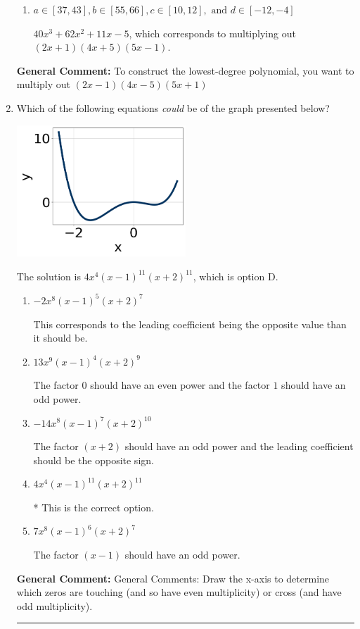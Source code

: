 \documentclass{extbook}[14pt]
\newcommand{\litem}[1]{\item #1

\rule{\textwidth}{0.4pt}}
\begin{document}
\begin{enumerate}
{\begin{enumerate}[label=\Alph*.]
$40x^{3} +78 x^{2} +39 x + 5$, which corresponds to multiplying out $(2x + 1)(4x + 5)(5x + 1)$.
\item \( a \in [37, 43], b \in [55, 66], c \in [10, 12], \text{ and } d \in [-12, -4] \)

$40x^{3} +62 x^{2} +11 x -5$, which corresponds to multiplying out $(2x + 1)(4x + 5)(5x -1)$.
\end{enumerate}

\textbf{General Comment:} To construct the lowest-degree polynomial, you want to multiply out $(2x -1)(4x -5)(5x + 1)$
}
\litem{
Which of the following equations \textit{could} be of the graph presented below?

\begin{center}
    \includegraphics[width=0.5\textwidth]{../Figures/polyGraphToFunctionCopyC.png}
\end{center}


The solution is \( 4x^{4} (x - 1)^{11} (x + 2)^{11} \), which is option D.\begin{enumerate}[label=\Alph*.]
\item \( -2x^{8} (x - 1)^{5} (x + 2)^{7} \)

This corresponds to the leading coefficient being the opposite value than it should be.
\item \( 13x^{9} (x - 1)^{4} (x + 2)^{9} \)

The factor $0$ should have an even power and the factor $1$ should have an odd power.
\item \( -14x^{8} (x - 1)^{7} (x + 2)^{10} \)

The factor $(x + 2)$ should have an odd power and the leading coefficient should be the opposite sign.
\item \( 4x^{4} (x - 1)^{11} (x + 2)^{11} \)

* This is the correct option.
\item \( 7x^{8} (x - 1)^{6} (x + 2)^{7} \)

The factor $(x - 1)$ should have an odd power.
\end{enumerate}

\textbf{General Comment:} General Comments: Draw the x-axis to determine which zeros are touching (and so have even multiplicity) or cross (and have odd multiplicity).
}
\end{enumerate}
\end{document}
